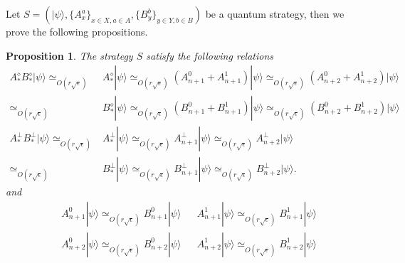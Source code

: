 \documentclass[11pt,letterpaper]{article}
\newcommand{\ket}[1]{|#1\rangle}
\newcommand{\bra}[1]{\langle#1|}
\newcommand{\ketbra}[2]{|#1\rangle\langle#2|}
\newcommand{\1}{\mathbb{1}}
\newcommand{\se}{\sqrt{\epsilon}}
\newcommand{\appd}[1]{\simeq_{#1}}
\newtheorem{proposition}[theorem]{Proposition}
\theoremstyle{definition}
\begin{document}
Let $S = (\ket{\psi}, \{A_x^a\}_{x \in X, a\in A}, \{B_y^b\}_{y \in Y, b\in B})$ be a quantum strategy, then
we prove the following propositions.
\begin{proposition}
The strategy $S$ satisfy the following relations
\begin{align}
	  A_\ast^\diamond B_\ast^\diamond \ket{\psi}
	  \appd{O( r\se)}&A_\ast^\diamond \ket{\psi} \appd{O( r\se)} (A_{n+1}^0+A_{n+1}^1)\ket{\psi} \appd{O( r\se)} (A_{n+2}^0+A_{n+2}^1)\ket{\psi} \\
	  \appd{O( r\se)}&B_\ast^\diamond \ket{\psi} \appd{O( r\se)} (B_{n+1}^0+B_{n+1}^1)\ket{\psi} \appd{O( r\se)} (B_{n+2}^0+B_{n+2}^1)\ket{\psi}\\
	A_\ast^\perp B_\ast^\perp\ket{\psi}\appd{O( r\se)} &A_\ast^\perp\ket{\psi} \appd{O( r\se)} A_{n+1}^\perp \ket{\psi} \appd{O( r\se)} A_{n+2}^\perp \ket{\psi}\\
	\appd{O( r\se)}&B_\ast^\perp\ket{\psi} \appd{O( r\se)} B_{n+1}^\perp \ket{\psi} \appd{O( r\se)} B_{n+2}^\perp \ket{\psi}.
\end{align}
and
\begin{align}
&A_{n+1}^0 \ket{\psi} \appd{O( r\se)} B_{n+1}^0 \ket{\psi} && A_{n+1}^1\ket{\psi} \appd{O( r\se)} B_{n+1}^1 \ket{\psi}\\
&A_{n+2}^0 \ket{\psi} \appd{O( r\se)} B_{n+2}^0 \ket{\psi} && A_{n+2}^1\ket{\psi} \appd{O( r\se)} B_{n+2}^1 \ket{\psi}
\end{align}
\end{proposition}
\end{document}
